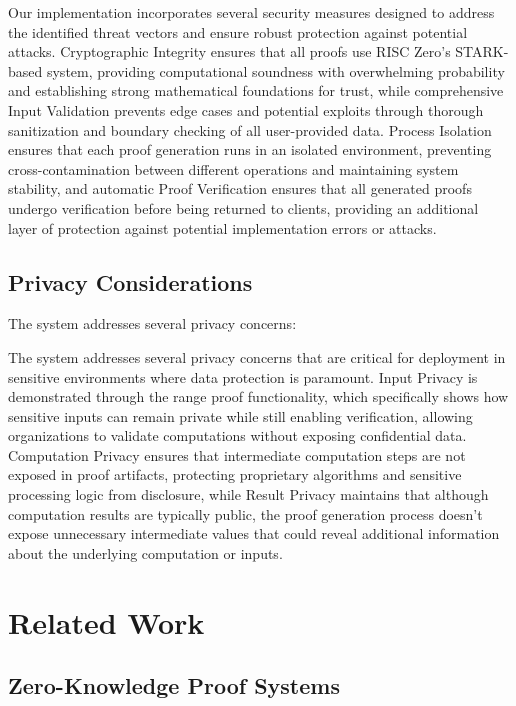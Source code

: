 \documentclass[11pt]{article}
\begin{document}
Our implementation incorporates several security measures designed to address the identified threat vectors and ensure robust protection against potential attacks. Cryptographic Integrity ensures that all proofs use RISC Zero's STARK-based system, providing computational soundness with overwhelming probability and establishing strong mathematical foundations for trust, while comprehensive Input Validation prevents edge cases and potential exploits through thorough sanitization and boundary checking of all user-provided data. Process Isolation ensures that each proof generation runs in an isolated environment, preventing cross-contamination between different operations and maintaining system stability, and automatic Proof Verification ensures that all generated proofs undergo verification before being returned to clients, providing an additional layer of protection against potential implementation errors or attacks.

\subsection{Privacy Considerations}

The system addresses several privacy concerns:

The system addresses several privacy concerns that are critical for deployment in sensitive environments where data protection is paramount. Input Privacy is demonstrated through the range proof functionality, which specifically shows how sensitive inputs can remain private while still enabling verification, allowing organizations to validate computations without exposing confidential data. Computation Privacy ensures that intermediate computation steps are not exposed in proof artifacts, protecting proprietary algorithms and sensitive processing logic from disclosure, while Result Privacy maintains that although computation results are typically public, the proof generation process doesn't expose unnecessary intermediate values that could reveal additional information about the underlying computation or inputs.

\section{Related Work}
\label{sec:related}

\subsection{Zero-Knowledge Proof Systems}
\end{document}
